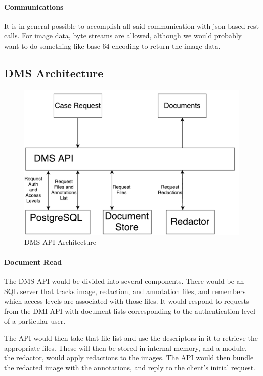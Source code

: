 \paragraph{Communications}It is in general possible to accomplish all said
communication with json-based rest calls.  For image data, byte streams are
allowed, although we would probably want to do something like base-64 encoding
to return the image data.

\subsection{DMS Architecture}
\begin{figure}[h]
	\begin{center}
		\includegraphics[scale=0.4]{images/DMSInternal.pdf}
	\end{center}
	\caption{DMS API Architecture}
	\label{fig:dmsArch}
\end{figure}

\paragraph{Document Read}The DMS API would be divided into several
components.  There would be an SQL server that tracks image, redaction, and
annotation files, and remembers which access levels are associated with those
files.  It would respond to requests from the DMI API with document lists
corresponding to the authentication level of a particular user.

The API would then take that file list and use the descriptors in it to
retrieve the appropriate files.  These will then be stored in internal memory,
and a module, the redactor, would apply redactions to the images.  The API
would then bundle the redacted image with the annotations, and reply to the
client's initial request.

